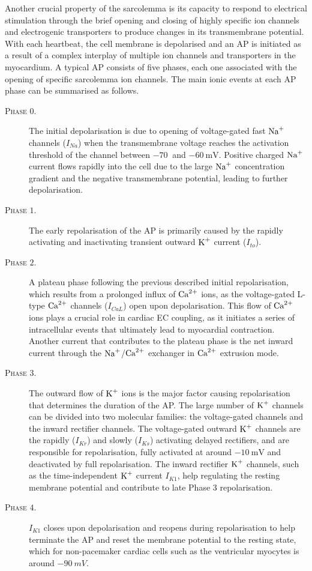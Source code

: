 \vspace{0.2cm}
Another crucial property of the sarcolemma is its capacity to respond to electrical stimulation through the brief opening and closing of highly specific ion channels and electrogenic transporters to produce changes in its transmembrane potential. With each heartbeat, the cell membrane is depolarised and an AP is initiated as a result of a complex interplay of multiple ion channels and transporters in the myocardium. A typical AP consists of five phases, each one associated with the opening of specific sarcolemma ion channels. The main ionic events at each AP phase can be summarised as follows.

\begin{description}
	\item[\textsc{Phase $0$.}] The initial depolarisation is due to opening of voltage-gated fast $\textrm{Na}^{+}$ channels ($I_{Na}$) when the transmembrane voltage reaches the activation threshold of the channel between $\SI{-70}{}$ and $\SI{-60}{\milli\volt}$. Positive charged $\textrm{Na}^{+}$ current flows rapidly into the cell due to the large $\textrm{Na}^{+}$ concentration gradient and the negative transmembrane potential, leading to further depolarisation.
	\item[\textsc{Phase $1$.}] The early repolarisation of the AP is primarily caused by the rapidly activating and inactivating transient outward $\textrm{K}^{+}$ current ($I_{to}$).
	\item[\textsc{Phase $2$.}] A plateau phase following the previous described initial repolarisation, which results from a prolonged influx of $\textrm{Ca}^{2+}$ ions, as the voltage-gated L-type $\textrm{Ca}^{2+}$ channels ($I_{CaL}$) open upon depolarisation. This flow of $\textrm{Ca}^{2+}$ ions plays a crucial role in cardiac EC coupling, as it initiates a series of intracellular events that ultimately lead to myocardial contraction. Another current that contributes to the plateau phase is the net inward current through the $\textrm{Na}^{+}$/$\textrm{Ca}^{2+}$ exchanger in $\textrm{Ca}^{2+}$ extrusion mode.
	\item[\textsc{Phase $3$.}] The outward flow of $\textrm{K}^{+}$ ions is the major factor causing repolarisation that determines the duration of the AP. The large number of $\textrm{K}^{+}$ channels can be divided into two molecular families: the voltage-gated channels and the inward rectifier channels. The voltage-gated outward $\textrm{K}^{+}$ channels are the rapidly ($I_{Kr}$) and slowly ($I_{Ks}$) activating delayed rectifiers, and are responsible for repolarisation, fully activated at around $\SI{-10}{\milli\volt}$ and deactivated by full repolarisation. The inward rectifier $\textrm{K}^{+}$ channels, such as the time-independent $\textrm{K}^{+}$ current $I_{K1}$, help regulating the resting membrane potential and contribute to late Phase $3$ repolarisation.
	\item[\textsc{Phase $4$.}] $I_{K1}$ closes upon depolarisation and reopens during repolarisation to help terminate the AP and reset the membrane potential to the resting state, which for non-pacemaker cardiac cells such as the ventricular myocytes is around $\SI{-90}{mV}$.
\end{description}

